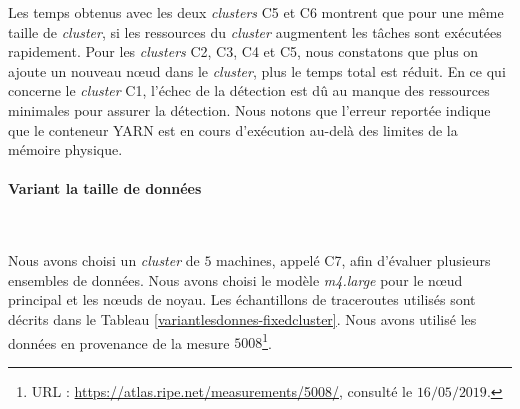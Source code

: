 


Les temps obtenus avec les deux \textit{clusters} C5 et C6 montrent que pour une même taille de \textit{cluster},  si les ressources du \textit{cluster} augmentent  les tâches sont exécutées rapidement. 
Pour les \textit{clusters} C2, C3, C4 et C5, nous constatons que plus on ajoute un nouveau n\oe{}ud dans  le \textit{cluster}, plus le temps total est réduit. En ce qui concerne le \textit{cluster} C1, l'échec de la détection est dû au manque des ressources minimales pour assurer la détection. Nous notons que l'erreur reportée  indique que le conteneur YARN est en cours d'exécution au-delà des limites de la mémoire physique.


\paragraph{Variant la taille de données}~


Nous avons choisi un \textit{cluster} de $ 5 $ machines, appelé C7, afin d'évaluer plusieurs ensembles de données. Nous avons choisi le modèle \textit{m4.large} pour le n\oe{}ud principal et les n\oe{}uds de noyau. Les échantillons de traceroutes utilisés sont décrits dans le Tableau \ref{variantlesdonnes-fixedcluster}. Nous avons utilisé les données en provenance de la mesure $ 5008 $\footnote{URL : \url{https://atlas.ripe.net/measurements/5008/}, consulté le $16/05/2019$.}.


\begin{table}[H]
	\centering
\caption{Les traceroutes utilisés dans le \textit{cluster} C7}
\label{variantlesdonnes-fixedcluster}
\end{table}

